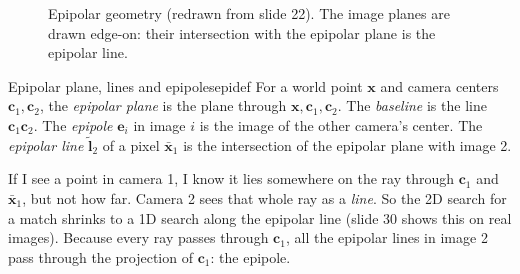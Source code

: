 \documentclass[11pt,a4paper]{article}
\newcommand{\xb}{\bar{\bm{x}}}      %
\begin{document}
\begin{figure}[H]
\centering
{}
\caption{Epipolar geometry (redrawn from slide 22). The image planes are drawn edge-on: their intersection with the epipolar plane is the epipolar line.}
\label{fig:epi}
\end{figure}

\begin{definition}{Epipolar plane, lines and epipoles}{epidef}
For a world point $\bm x$ and camera centers $\bm c_1,\bm c_2$, the \emph{epipolar plane} is the plane through $\bm x,\bm c_1,\bm c_2$. The \emph{baseline} is the line
$\bm c_1\bm c_2$. The \emph{epipole} $\bm e_i$ in image $i$ is the image of the other camera's center. The \emph{epipolar line} $\tilde{\bm l}_2$ of a pixel
$\xb_1$ is the intersection of the epipolar plane with image 2.
\end{definition}

\begin{intuition}
If I see a point in camera 1, I know it lies somewhere on the ray through $\bm c_1$ and $\xb_1$, but not how far. Camera 2 sees that whole ray as a
\emph{line}. So the 2D search for a match shrinks to a 1D search along the epipolar line (slide 30 shows this on real images). Because every ray passes through $\bm c_1$, all
the epipolar lines in image 2 pass through the projection of $\bm c_1$: the epipole.
\end{intuition}
\end{document}
